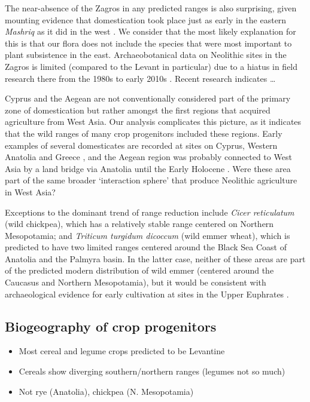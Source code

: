 \documentclass[
  authoryear,
  preprint]{elsarticle}
\providecommand{\tightlist}{%
  \setlength{\itemsep}{0pt}\setlength{\parskip}{0pt}}\usepackage{longtable,booktabs,array}
\begin{document}
The near-absence of the Zagros in any predicted ranges is also
surprising, given mounting evidence that domestication took place just
as early in the eastern \emph{Mashriq} as it did in the west
\citep{Braidwood, GanjDarehGoats, HillyFlanksStuff}. We consider that
the most likely explanation for this is that our flora does not include
the species that were most important to plant subsistence in the east.
Archaeobotanical data on Neolithic sites in the Zagros is limited
(compared to the Levant in particular) due to a hiatus in field research
there from the 1980s to early 2010s \citep{cite}. Recent research
\citep{Amaia} indicates \ldots{}

Cyprus and the Aegean are not conventionally considered part of the
primary zone of domestication but rather amongst the first regions that
acquired agriculture from West Asia. Our analysis complicates this
picture, as it indicates that the wild ranges of many crop progenitors
included these regions. Early examples of several domesticates are
recorded at sites on Cyprus, Western Anatolia and Greece
\citep{ArranzOtaeguiRoe2023}, and the Aegean region was probably
connected to West Asia by a land bridge via Anatolia until the Early
Holocene \citep{AksuHiscott2022}. Were these area part of the same
broader `interaction sphere' \citep{cite} that produce Neolithic
agriculture in West Asia?

Exceptions to the dominant trend of range reduction include \emph{Cicer
reticulatum} (wild chickpea), which has a relatively stable range
centered on Northern Mesopotamia; and \emph{Triticum turgidum dicoccum}
(wild emmer wheat), which is predicted to have two limited ranges
centered around the Black Sea Coast of Anatolia and the Palmyra basin.
In the latter case, neither of these areas are part of the predicted
modern distribution of wild emmer (centered around the Caucasus and
Northern Mesopotamia), but it would be consistent with archaeological
evidence for early cultivation at sites in the Upper Euphrates
\citep{Willcox2024}.

\subsection{Biogeography of crop
progenitors}\label{biogeography-of-crop-progenitors}

\begin{itemize}
\tightlist
\item
  Most cereal and legume crops predicted to be Levantine
\item
  Cereals show diverging southern/northern ranges (legumes not so much)
\item
  Not rye (Anatolia), chickpea (N. Mesopotamia)
\end{itemize}
\end{document}
